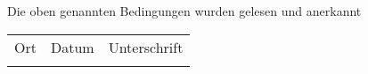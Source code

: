 \begin{Form}
	Die oben genannten Bedingungen wurden gelesen und anerkannt\\
	
	\begin{tabu}{XXX[2]}
		Ort & Datum & Unterschrift \\
		\TextField[name=SIGN_ORT]{} & \TextField[name=SIGN_DATUM]{} & \TextField[name=SIGN]{} \\
	\end{tabu}
	
	
\end{Form}
